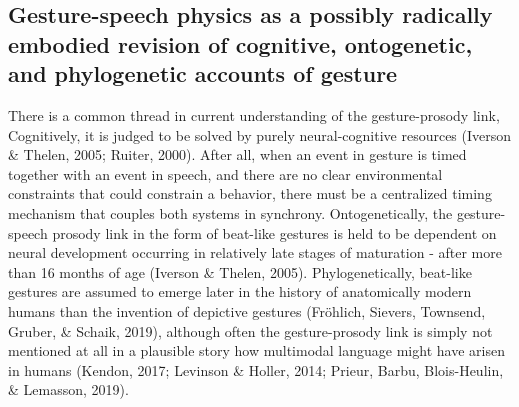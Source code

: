 \documentclass[
  man,floatsintext]{apa6}
\begin{document}
\hypertarget{gesture-speech-physics-as-a-possibly-radically-embodied-revision-of-cognitive-ontogenetic-and-phylogenetic-accounts-of-gesture}{%
\subsection{Gesture-speech physics as a possibly radically embodied revision of cognitive, ontogenetic, and phylogenetic accounts of gesture}\label{gesture-speech-physics-as-a-possibly-radically-embodied-revision-of-cognitive-ontogenetic-and-phylogenetic-accounts-of-gesture}}

There is a common thread in current understanding of the gesture-prosody link, Cognitively, it is judged to be solved by purely neural-cognitive resources (Iverson \& Thelen, 2005; Ruiter, 2000). After all, when an event in gesture is timed together with an event in speech, and there are no clear environmental constraints that could constrain a behavior, there must be a centralized timing mechanism that couples both systems in synchrony. Ontogenetically, the gesture-speech prosody link in the form of beat-like gestures is held to be dependent on neural development occurring in relatively late stages of maturation - after more than 16 months of age (Iverson \& Thelen, 2005). Phylogenetically, beat-like gestures are assumed to emerge later in the history of anatomically modern humans than the invention of depictive gestures (Fröhlich, Sievers, Townsend, Gruber, \& Schaik, 2019), although often the gesture-prosody link is simply not mentioned at all in a plausible story how multimodal language might have arisen in humans (Kendon, 2017; Levinson \& Holler, 2014; Prieur, Barbu, Blois-Heulin, \& Lemasson, 2019).\\
\end{document}
